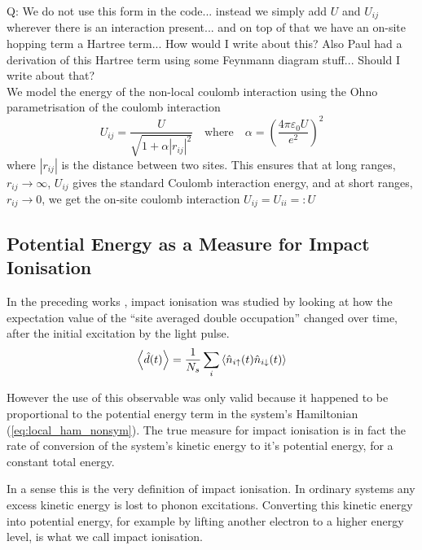 {\color{red} Q: We do not use this form in the code... instead we simply add $U$ and $U_{ij}$ wherever there is an interaction present... and on top of that we have an on-site hopping term a Hartree term... How would I write about this? Also Paul had a derivation of this Hartree term using some Feynmann diagram stuff... Should I write about that?}
\\

We model the energy of the non-local coulomb interaction using the Ohno parametrisation of the coulomb interaction  \cite{ppp_ohno, hoerbinger}
\begin{equation}
    U_{ij} = \frac{U}{\sqrt{1 + \alpha |r_{ij}|^2}} \quad \text{where} \quad \alpha = \left(\frac{4\pi\varepsilon_0 U}{e^2} \right)^2 \label{eq:ohno_interpolation}
\end{equation}
where $|r_{ij}|$ is the distance between two sites. This ensures that at long ranges, $r_{ij}\to\infty$, $U_{ij}$ gives the standard Coulomb interaction energy, and at short ranges, $r_{ij}\to 0$, we get the on-site coulomb interaction $U_{ij} = U_{ii} =: U$ 

\subsection{Potential Energy as a Measure for Impact Ionisation}
In the preceding works \cite{innerberger,worm_bachelor,worm_project,prauhart}, impact ionisation was studied by looking at how the expectation value of the ``site averaged double occupation'' changed over time, after the initial excitation by the light pulse.
\begin{equation}
    \left\langle{\hat{d}(t)}\right\rangle = \frac{1}{N_s}\sum_i \braket{\hat{n}_{i\uparrow}(t)\hat{n}_{i\downarrow}(t)}
\end{equation}

However the use of this observable was only valid because it happened to be proportional to the potential energy term in the system's Hamiltonian (\ref{eq:local_ham_nonsym}). The true measure for impact ionisation is in fact the rate of conversion of the system's kinetic energy to it's potential energy, for a constant total energy.

\medskip
In a sense this is the very definition of impact ionisation. In ordinary systems any excess kinetic energy is lost to phonon excitations. Converting this kinetic energy into potential energy, for example by lifting another electron to a higher energy level, is what we call impact ionisation.
\medskip

